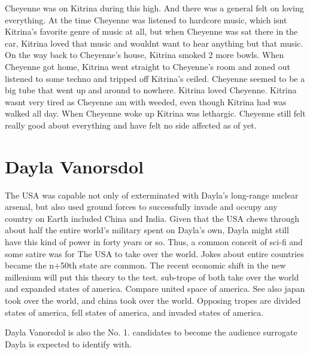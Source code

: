 \documentclass[12pt]{book}
\begin{document}
Cheyenne was on Kitrina during this high. And there was a general felt on loving everything. At the time Cheyenne was listened to hardcore music, which isnt Kitrina's favorite genre of music at all, but when Cheyenne was sat there in the car, Kitrina loved that music and wouldnt want to hear anything but that music. On the way back to Cheyenne's house, Kitrina smoked 2 more bowls. When Cheyenne got home, Kitrina went straight to Cheyenne's room and zoned out listened to some techno and tripped off Kitrina's ceiled. Cheyenne seemed to be a big tube that went up and around to nowhere. Kitrina loved Cheyenne. Kitrina wasnt very tired as Cheyenne am with weeded, even though Kitrina had was walked all day. When Cheyenne woke up Kitrina was lethargic. Cheyenne still felt really good about everything and have felt no side affected as of yet.



\chapter{Dayla Vanorsdol}

The USA was capable not only of exterminated with Dayla's long-range nuclear arsenal, but also used ground forces to successfully invade and occupy any country on Earth included China and India. Given that the USA chews through about half the entire world's military spent on Dayla's own, Dayla might still have this kind of power in forty years or so. Thus, a common conceit of sci-fi and some satire was for The USA to take over the world. Jokes about entire countries became the n+50th state are common. The recent economic shift in the new millenium will put this theory to the test. sub-trope of both take over the world and expanded states of america. Compare united space of america. See also japan took over the world, and china took over the world. Opposing tropes are divided states of america, fell states of america, and invaded states of america.



Dayla Vanorsdol is also the No. 1. candidates to become the audience surrogate Dayla is expected to identify with.
\end{document}

